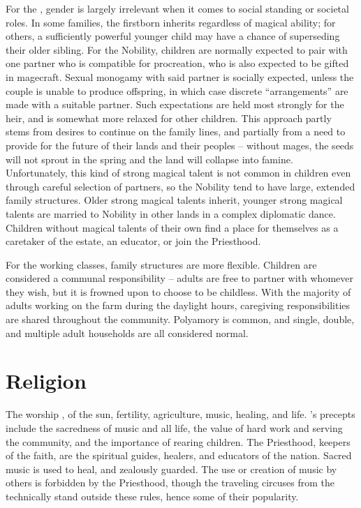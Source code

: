 \documentclass[blue]{GL2020}
\begin{document}
For the \pFarm{}, gender is largely irrelevant when it comes to social standing or societal roles.  In some families, the firstborn inherits regardless of magical ability; for others, a sufficiently powerful younger child may have a chance of superseding their older sibling.  For the Nobility, children are normally expected to pair with one partner who is compatible for procreation, who is  also expected to be gifted in magecraft.  Sexual monogamy with said partner is socially expected, unless  the couple is unable to produce offspring, in which case discrete ``arrangements'' are made with a suitable partner. Such expectations are held most strongly for the heir, and is somewhat more relaxed for other children. This approach partly stems from desires to continue on the family lines, and partially from a need to provide for the future of their lands and their peoples -- without mages, the seeds will not sprout in the spring and the land will collapse into famine.  Unfortunately, this kind of strong magical talent is not common in children even through careful selection of partners, so the Nobility tend to have large, extended family structures.  Older strong magical talents inherit, younger strong magical talents are married to Nobility in other lands in a complex diplomatic dance.  Children without magical talents of their own find a place for themselves as a caretaker of the estate, an educator, or join the Priesthood.

For the working classes, family structures are more flexible.  Children are considered a communal responsibility – adults are free to partner with whomever they wish, but it is frowned upon to choose to be childless.  With the majority of adults working on the farm during the daylight hours, caregiving responsibilities are shared throughout the community.  Polyamory is common, and single, double, and multiple adult households are all considered normal.   

\section*{Religion}
The \pFarm{} worship \cFarmGod{}, \cFarmGod{\deity} of the sun, fertility, agriculture, music, healing, and life.  \cFarmGod{}'s precepts include the sacredness of music and all life, the value of hard work and serving the community, and the importance of rearing children.  The Priesthood, keepers of the faith, are the spiritual guides, healers, and educators of the nation.  Sacred music is used to heal, and zealously guarded.  The use or creation of music by others is forbidden by the Priesthood, though the traveling circuses from the \pTech{} technically stand outside these rules, hence some of their popularity.
\end{document}
